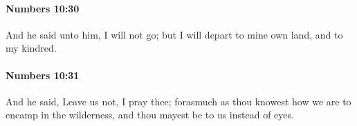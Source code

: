 		\paragraph{Numbers 10:30} %
			\label{NUMBERS-10-30}

			And he said unto him, I will not go; but I will depart to mine own land, and to my kindred.


		\paragraph{Numbers 10:31} %
			\label{NUMBERS-10-31}

			And he said, Leave us not, I pray thee; forasmuch as thou knowest how we are to encamp in the wilderness, and thou mayest be to us instead of eyes.


